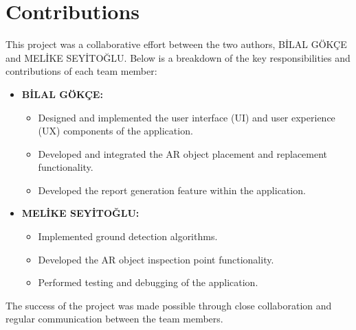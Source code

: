 \chapter*{Contributions}

This project was a collaborative effort between the two authors, BİLAL GÖKÇE and MELİKE SEYİTOĞLU. Below is a breakdown of the key responsibilities and contributions of each team member:

\begin{itemize}
    \item \textbf{BİLAL GÖKÇE:}
    \begin{itemize}
        \item Designed and implemented the user interface (UI) and user experience (UX) components of the application.
        \item Developed and integrated the AR object placement and replacement functionality.
        \item Developed the report generation feature within the application.
    \end{itemize}
    \item \textbf{MELİKE SEYİTOĞLU:}
    \begin{itemize}
        \item Implemented ground detection algorithms.
        \item Developed the AR object inspection point functionality.
        \item Performed testing and debugging of the application.
    \end{itemize}
\end{itemize}

The success of the project was made possible through close collaboration and regular communication between the team members.
